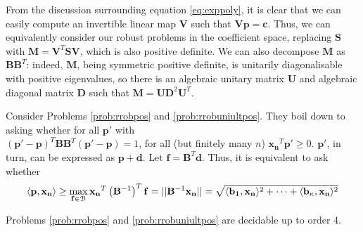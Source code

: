 From the discussion surrounding equation \ref{eq:exppoly}, it is clear that we can easily compute an invertible linear map $\mathbf{V}$ such that $\mathbf{Vp} = \mathbf{c}$. Thus, we can equivalently consider our robust problems in the coefficient space, replacing $\mathbf{S}$ with $\mathbf{M} = \mathbf{V}^T\mathbf{SV}$, which is also positive definite. We can also decompose $\mathbf{M}$ as $\mathbf{B}\mathbf{B}^T$: indeed, $\mathbf{M}$, being symmetric positive definite, is unitarily diagonalisable with positive eigenvalues, so there is an algebraic unitary matrix $\mathbf{U}$ and algebraic diagonal matrix $\mathbf{D}$ such that $\mathbf{M} = \mathbf{U}\mathbf{D}^2\mathbf{U}^T$.

Consider Problems \ref{prob:rrobpos} and \ref{prob:rrobuniultpos}. They boil down to asking whether for all $\mathbf{p'}$ with\\ 
$(\mathbf{p'}-\mathbf{p})^T\mathbf{BB}^T(\mathbf{p'} - \mathbf{p}) = 1$, for all (but finitely many $n$) $\mathbf{x_n}^T\mathbf{p'} \ge 0$. $\mathbf{p'}$, in turn, can be expressed as $\mathbf{p} + \mathbf{d}$. Let $\mathbf{f} = \mathbf{B}^T\mathbf{d}$. Thus, it is equivalent to ask whether
\begin{equation}
\label{eq:crux}
\langle\mathbf{p}, \mathbf{x_n}\rangle \ge \max_{\mathbf{f} \in \mathcal{B}}\mathbf{x_n}^T\left(\mathbf{B}^{-1}\right)^T\mathbf{f} = ||\mathbf{B}^{-1}\mathbf{x_n}|| = \sqrt{\langle\mathbf{b_1}, \mathbf{x_n}\rangle^2 +\dots+\langle\mathbf{b_\kappa}, \mathbf{x_n}\rangle^2}
\end{equation}

\begin{theorem}
\label{thm:decide}
Problems \ref{prob:rrobpos} and \ref{prob:rrobuniultpos} are decidable up to order 4.
\end{theorem}

